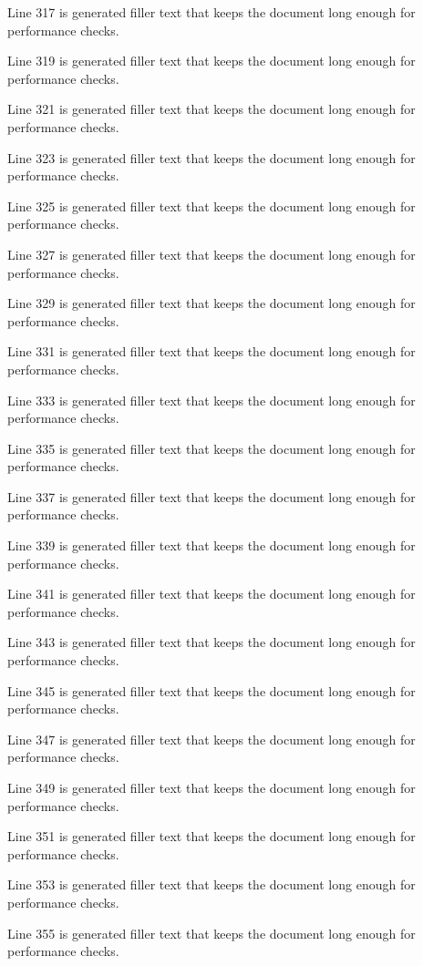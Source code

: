 Line 317 is generated filler text that keeps the document long enough for performance checks.

Line 319 is generated filler text that keeps the document long enough for performance checks.

Line 321 is generated filler text that keeps the document long enough for performance checks.

Line 323 is generated filler text that keeps the document long enough for performance checks.

Line 325 is generated filler text that keeps the document long enough for performance checks.

Line 327 is generated filler text that keeps the document long enough for performance checks.

Line 329 is generated filler text that keeps the document long enough for performance checks.

Line 331 is generated filler text that keeps the document long enough for performance checks.

Line 333 is generated filler text that keeps the document long enough for performance checks.

Line 335 is generated filler text that keeps the document long enough for performance checks.

Line 337 is generated filler text that keeps the document long enough for performance checks.

Line 339 is generated filler text that keeps the document long enough for performance checks.

Line 341 is generated filler text that keeps the document long enough for performance checks.

Line 343 is generated filler text that keeps the document long enough for performance checks.

Line 345 is generated filler text that keeps the document long enough for performance checks.

Line 347 is generated filler text that keeps the document long enough for performance checks.

Line 349 is generated filler text that keeps the document long enough for performance checks.

Line 351 is generated filler text that keeps the document long enough for performance checks.

Line 353 is generated filler text that keeps the document long enough for performance checks.

Line 355 is generated filler text that keeps the document long enough for performance checks.

